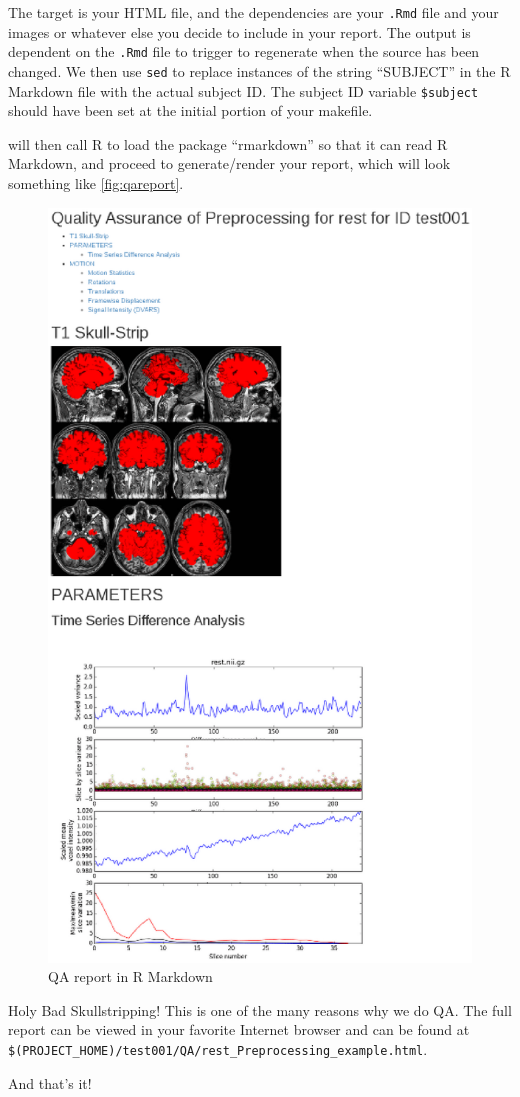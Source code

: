 The target is your HTML file, and the dependencies are your \texttt{.Rmd} file and your images or whatever else you decide to include in your report. The output is dependent on the \texttt{.Rmd} file to trigger to regenerate when the source has been changed. We then use \texttt{sed} to replace instances of the string ``SUBJECT'' in the R Markdown file with the actual subject ID. The subject ID variable \texttt{\$subject} should have been set at the initial portion of your makefile. 

\maken{} will then call R to load the package ``rmarkdown'' so that it can read R Markdown, and proceed to generate/render your report, which will look something like \autoref{fig:qareport}. 

\begin{figure}
	\begin{center}
		\includegraphics[scale=.6]{../images/QAcropped.eps}
		\caption{QA report in R Markdown}
		                \label{fig:qareport}
	\end{center}
\end{figure}

Holy Bad Skullstripping! This is one of the many reasons why we do QA. The full report can be viewed in your favorite Internet browser and can be found at \texttt{\$(PROJECT\_HOME)/test001/QA/rest\_Preprocessing\_example.html}. 
 
And that's it! 






